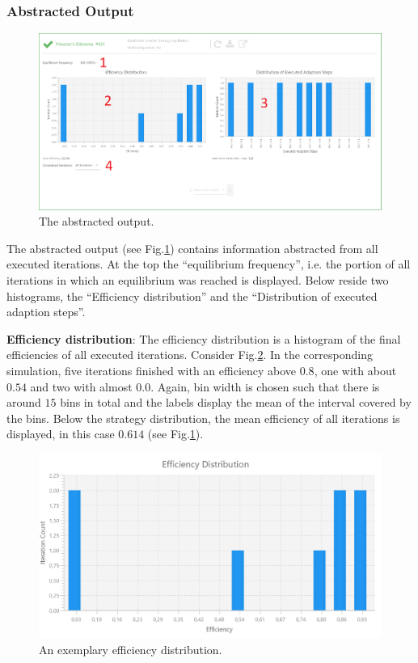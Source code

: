 \documentclass[parskip=full,11pt]{scrartcl}
\newcommand*\circled[1]{\tikz[baseline=(char.base)]{
            \node[shape=circle,draw,inner sep=2pt] (char) {#1};}}
\begin{document}
\subsubsection{Abstracted Output}
\begin{figure}
	\centering
	\includegraphics[width=\linewidth]{img_manual/abstracted_output.png}
	\caption{The abstracted output.}
	\label{fig:abstracted_output}
\end{figure}
The abstracted output (see Fig.\ref{fig:abstracted_output}) contains information abstracted from all executed iterations. At the top \circled{1} the \enquote{equilibrium frequency}, i.e. the portion of all iterations in which an equilibrium was reached is displayed. Below reside two histograms, the \enquote{Efficiency distribution} and the \enquote{Distribution of executed adaption steps}.

\textbf{Efficiency distribution}: The efficiency distribution \circled{2} is a histogram of the final efficiencies of all executed iterations. Consider Fig.\ref{fig:efficiency_distribution}. In the corresponding simulation, five iterations finished with an efficiency above \(0.8\), one with about \(0.54\) and two with almost \(0.0\). Again, bin width is chosen such that there is around \(15\) bins in total and the labels display the mean of the interval covered by the bins. Below the strategy distribution, the mean efficiency of all iterations is displayed, in this case \(0.614\) (see Fig.\ref{fig:abstracted_output}).

\begin{figure}[h]
	\centering
	\includegraphics[width=0.7\linewidth]{img_manual/efficiency_distribution.png}
	\caption{An exemplary efficiency distribution.}
	\label{fig:efficiency_distribution}
\end{figure}
\end{document}
